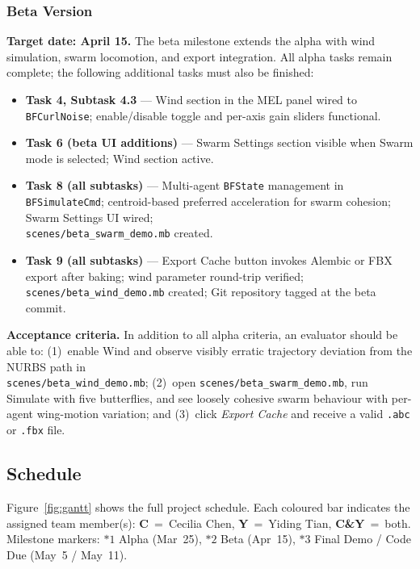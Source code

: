 \documentclass[12pt]{article}
\begin{document}
\subsubsection{Beta Version}

\textbf{Target date: April 15.} \quad
The beta milestone extends the alpha with wind simulation, swarm locomotion,
and export integration. All alpha tasks remain complete; the following
additional tasks must also be finished:

\begin{itemize}
  \item \textbf{Task 4, Subtask 4.3} --- Wind section in the MEL panel wired to
    \texttt{BFCurlNoise}; enable/disable toggle and per-axis gain sliders functional.
  \item \textbf{Task 6 (beta UI additions)} --- Swarm Settings section visible when Swarm
    mode is selected; Wind section active.
  \item \textbf{Task 8 (all subtasks)} --- Multi-agent \texttt{BFState} management
    in \texttt{BFSimulateCmd}; centroid-based preferred acceleration for swarm
    cohesion; Swarm Settings UI wired;
    \\ \texttt{scenes/beta\_swarm\_demo.mb} created.
  \item \textbf{Task 9 (all subtasks)} --- Export Cache button invokes Alembic or
    FBX export after baking; wind parameter round-trip verified;
    \texttt{scenes/beta\_wind\_demo.mb} created; Git repository tagged at the beta
    commit.
\end{itemize}

\noindent\textbf{Acceptance criteria.}
In addition to all alpha criteria, an evaluator should be able to: (1)~enable Wind
and observe visibly erratic trajectory deviation from the NURBS path in \\
\texttt{scenes/beta\_wind\_demo.mb}; (2)~open \texttt{scenes/beta\_swarm\_demo.mb},
run Simulate with five butterflies, and see loosely cohesive swarm behaviour with
per-agent wing-motion variation; and (3)~click \textit{Export Cache} and receive a
valid \texttt{.abc} or \texttt{.fbx} file.

\subsection{Schedule}

Figure~\ref{fig:gantt} shows the full project schedule. Each coloured bar indicates
the assigned team member(s): \textbf{C}~=~Cecilia Chen, \textbf{Y}~=~Yiding Tian,
\textbf{C\&Y}~=~both. Milestone markers: $*1$ Alpha (Mar~25),
$*2$ Beta (Apr~15), $*3$ Final Demo / Code Due (May~5 / May~11).
\end{document}
